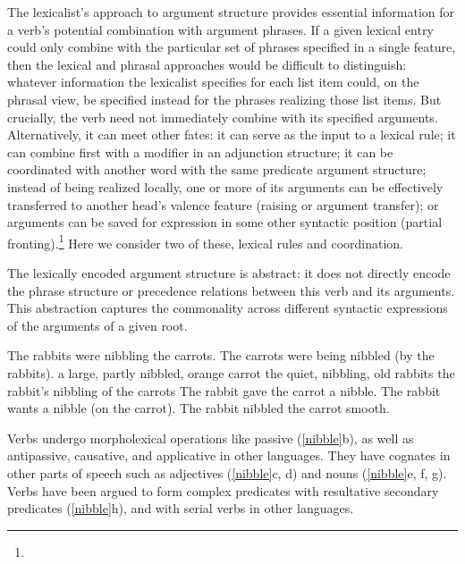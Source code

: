 \documentclass[output=paper
 	        ,biblatex
                ,babelshorthands
                ,newtxmath
                ,draftmode
                ,colorlinks, citecolor=brown
]{langscibook}
\begin{document}
The lexicalist’s approach to argument structure provides essential information for a verb's potential
combination with argument phrases.   If a given lexical entry could only  combine with the particular set of phrases specified in a single  feature, then the lexical and phrasal approaches would be difficult to distinguish: whatever information the lexicalist specifies for each  list item could, on the phrasal view, be specified instead for the phrases realizing those list items.  
But crucially, the verb need not immediately combine with its specified
arguments.  Alternatively, it can meet other fates: it can serve as the input to a lexical rule; it
can combine first with a modifier in an adjunction structure; it can be coordinated with another
word with the same predicate argument structure; instead of being realized locally, one or more of
its arguments can be effectively transferred to another head’s valence feature (raising or argument
transfer); or arguments can be saved for expression in some other syntactic position (partial
fronting).\footnote{
} Here we consider two of these, lexical rules and coordination.  
 
The lexically encoded argument structure is abstract: it does not directly encode the phrase structure or
precedence relations between this verb and its arguments. This abstraction captures the commonality
across different syntactic expressions of the arguments of a given root.

\begin{exe}
\ex \label{nibble}
\begin{xlist}
\ex  The rabbits were nibbling the carrots.  
\ex  The carrots were being nibbled (by the rabbits).
\ex  a large, partly nibbled, orange carrot 
\ex  the quiet, nibbling, old rabbits
\ex  the rabbit's nibbling of the carrots
\ex  The rabbit gave the carrot a nibble.  
\ex  The rabbit wants a nibble (on the carrot).  
\ex  The rabbit nibbled the carrot smooth.
\end{xlist}
\end{exe}

\noindent
Verbs undergo  morpholexical operations like passive
(\ref{nibble}b), as well as antipassive, causative, and applicative in other languages.  They have cognates in
other parts of speech such as adjectives  (\ref{nibble}c, d) and nouns  (\ref{nibble}e, f, g).  
Verbs have been argued to form complex predicates with resultative secondary predicates (\ref{nibble}h), and with serial verbs in other languages.   
\end{document}
